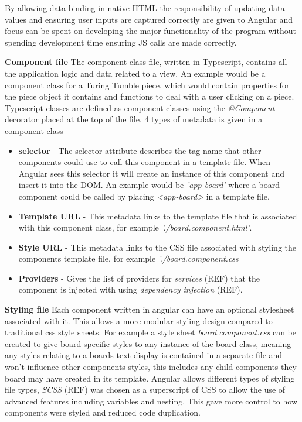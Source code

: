 \documentclass{l4proj}
\begin{document}
By allowing data binding in native HTML the responsibility of updating data values and ensuring user inputs are captured correctly are given to Angular and focus can be spent on developing the major functionality of the program without spending development time ensuring JS calls are made correctly. 

\textbf{Component file}
The component class file, written in Typescript, contains all the application logic and data related to a view. An example would be a component class for a Turing Tumble piece, which would contain properties for the piece object it contains and functions to deal with a user clicking on a piece. Typescript classes are defined as component classes using the \emph{@Component} decorator placed at the top of the file. 4 types of metadata is given in a component class
\begin{itemize}
    \item \textbf{selector} - The selector attribute describes the tag name that other components could use to call this component in a template file. When Angular sees this selector it will create an instance of this component and insert it into the DOM. An example would be \emph{'app-board'} where a board component could be called by placing \emph{<app-board>} in a template file.
    \item \textbf{Template URL} - This metadata links to the template file that is associated with this component class, for example \emph{'./board.component.html'}.
    \item \textbf{Style URL} - This metadata links to the CSS file associated with styling the components template file, for example \emph{'./board.component.css}
    \item \textbf{Providers} - Gives the list of providers for \emph{services} (REF) that the component is injected with using \emph{dependency injection} (REF).
\end{itemize}

\textbf{Styling file}
Each component written in angular can have an optional stylesheet associated with it. This allows a more modular styling design compared to traditional css style sheets. For example a style sheet \emph{board.component.css} can be created to give board specific styles to any instance of the board class, meaning any styles relating to a boards text display is contained in a separate file and won't influence other components styles, this includes any child components they board may have created in its template. Angular allows different types of styling file types, \emph{SCSS} (REF) was chosen as a superscript of CSS to allow the use of advanced features including variables and nesting. This gave more control to how components were styled and reduced code duplication.
\end{document}
